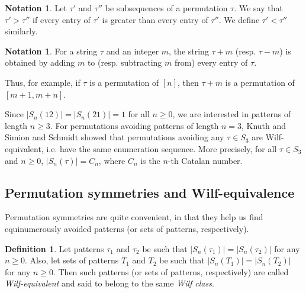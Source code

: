 \documentclass[
final
]{dmtcs-episciences}
\theoremstyle{definition}
\newtheorem{definition}[theorem]{Definition}
\newtheorem{notation}[theorem]{Notation}
\theoremstyle{remark}
\begin{document}

\begin{notation}
Let $\tau'$ and $\tau''$ be subsequences of a permutation $\tau$.  We say that $\tau' > \tau''$ if every entry of $\tau'$ is greater than every entry of $\tau''$.  We define $\tau' < \tau''$ similarly.
\end{notation}

\begin{notation}
For a string $\tau$ and an integer $m$, the string $\tau + m$ (resp. $\tau - m$) is obtained by adding $m$ to (resp. subtracting $m$ from) every entry of $\tau$.
\end{notation}

Thus, for example, if $\tau$ is a permutation of $[n]$, then $\tau+m$ is a permutation of $[m+1,m+n]$.

Since $|S_n(12)| = |S_n(21)| = 1$ for all $n \ge 0$, we are interested in patterns of length $n \ge 3$. For permutations avoiding patterns of length $n=3$, Knuth \cite{Knuth} and Simion and Schmidt \cite {Simion} showed that permutations avoiding any $\tau \in S_3$ are Wilf-equivalent, i.e. have the same enumeration sequence.  More precisely, for all $\tau\in S_3$ and $n \ge 0$, $|S_n(\tau)| = C_n$, where $C_n$ is the $n$-th Catalan number. 


\subsection{Permutation symmetries and Wilf-equivalence}


Permutation symmetries are quite convenient, in that they help us find equinumerously avoided patterns (or sets of patterns, respectively). 

\begin{definition}
Let patterns $\tau_1$ and $\tau_2$ be such that $|S_n(\tau_1)| = |S_n(\tau_2)|$ for any $n \ge 0$.  Also, let sets of patterns $T_1$ and $T_2$ be such that $|S_n(T_1)| = |S_n(T_2)|$ for any $n \ge 0$.  Then such patterns (or sets of patterns, respectively) are called \emph{Wilf-equivalent} and said to belong to the same \emph{Wilf class}.
\end{definition}
\end{document}
